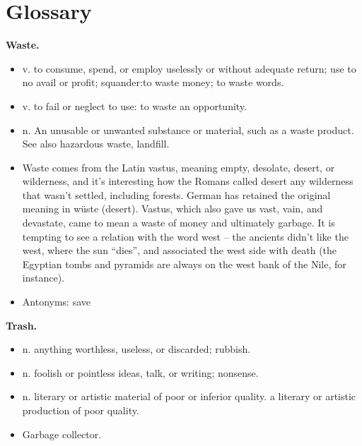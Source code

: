 \appendix
\chapter{Glossary}

\noindent\textbf{Waste.}
\begin{itemize}
\item v. to consume, spend, or employ uselessly or without adequate return; use to no avail or profit; squander:to waste money; to waste words.
\item v. to fail or neglect to use: to waste an opportunity.
\item n. An unusable or unwanted substance or material, such as a waste product. See also hazardous waste, landfill. 
\item Waste comes from the Latin vastus, meaning empty, desolate, desert, or wilderness, and it’s interesting how the Romans called desert any wilderness that wasn’t settled, including forests.  German has retained the original meaning in wüste (desert). Vastus, which also gave us vast, vain, and devastate, came to mean a waste of money and ultimately garbage.  It is tempting to see a relation with the word west – the ancients didn’t like the west, where the sun “dies”, and associated the west side with death (the Egyptian tombs and pyramids are always on the west bank of the Nile, for instance)\cite{paul2013garbage}.
\item Antonyms: save
\end{itemize}

\noindent\textbf{Trash.}
\begin{itemize}
\item n. anything worthless, useless, or discarded; rubbish.
\item n. foolish or pointless ideas, talk, or writing; nonsense.
\item n. literary or artistic material of poor or inferior quality. a literary or artistic production of poor quality.
\item Garbage collector.
\end{itemize}

